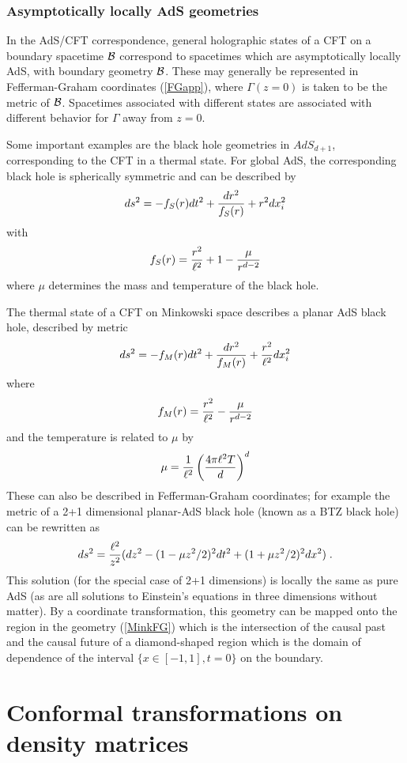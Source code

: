 \documentclass[12pt,epsf]{article}
\newcommand{\be}{\begin{equation}}
\newcommand{\ee}{\end{equation}}
\begin{document}
\subsubsection*{Asymptotically locally AdS geometries}

In the AdS/CFT correspondence, general holographic states of a CFT on a boundary spacetime ${\cal B}$ correspond to spacetimes which are asymptotically locally AdS, with boundary geometry ${\cal B}$. These may generally be represented in Fefferman-Graham coordinates (\ref{FGapp}), where $\Gamma(z=0)$ is taken to be the metric of ${\cal B}$. Spacetimes associated with different states are associated with different behavior for $\Gamma$ away from $z=0$.

Some important examples are the black hole geometries in $AdS_{d+1}$, corresponding to the CFT in a thermal state. For global AdS, the corresponding black hole is spherically symmetric and can be described by
\be
ds^2 = -f_S(r) dt^2 + {dr^2 \over f_S(r)} + r^2 d x_i^2
\ee
with
\be
f_S(r) = {r^2 \over \ell^2} + 1 - {\mu \over r^{d-2}}
\ee
where $\mu$ determines the mass and temperature of the black hole.

The thermal state of a CFT on Minkowski space describes a planar AdS black hole, described by metric
\be
ds^2 = -f_M(r) dt^2 + {dr^2 \over f_M(r)} + {r^2 \over \ell^2} d x_i^2
\ee
where
\be
f_M(r) = {r^2 \over \ell^2}  - {\mu \over r^{d-2}}
\ee
and the temperature is related to $\mu$ by
\be
\mu = {1 \over \ell^2} \left( {4 \pi \ell^2 T \over d} \right)^d
\ee
These can also be described in Fefferman-Graham coordinates; for example the metric of a 2+1 dimensional planar-AdS black hole (known as a BTZ black hole) can be rewritten as
\be
\label{BTZ}
ds^2 = {\ell^2 \over z^2} (dz^2 -(1 - \mu z^2 /2)^2 dt^2 + (1 + \mu z^2 /2)^2 dx^2) \; .
\ee
This solution (for the special case of 2+1 dimensions) is locally the same as pure AdS (as are all solutions to Einstein's equations in three dimensions without matter). By a coordinate transformation, this geometry can be mapped onto the region in the geometry (\ref{MinkFG}) which is the intersection of the causal past and the causal future of a diamond-shaped region which is the domain of dependence of the interval $\{x \in [-1,1], t=0 \}$ on the boundary.

\section{Conformal transformations on density matrices}\label{ConfTrans}
\end{document}
